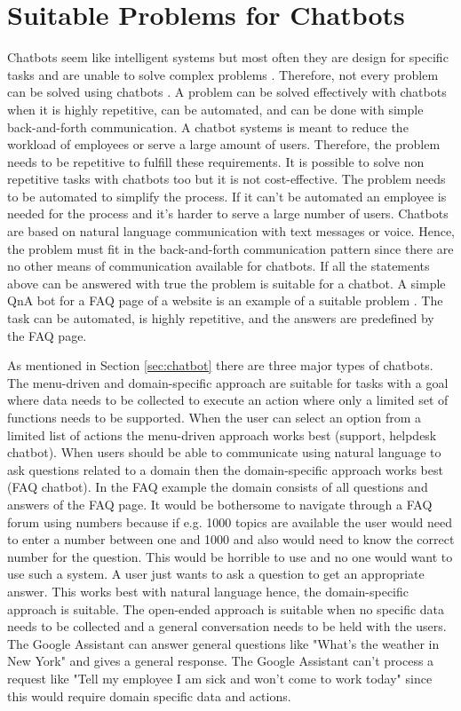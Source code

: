\section{Suitable Problems for Chatbots} 
Chatbots seem like intelligent systems but most often they are design for specific tasks
and are unable to solve complex problems \cite{buiildChatbotsPython}.
Therefore, not every problem can be solved using chatbots \cite{buiildChatbotsPython}.
A problem can be solved effectively with chatbots when it is highly repetitive, can be automated, and 
can be done with simple back-and-forth communication.
A chatbot systems is meant to reduce the workload of employees or serve a large amount of users.
Therefore, the problem needs to be repetitive to fulfill these requirements.
It is possible to solve non repetitive tasks with chatbots too but it is not cost-effective.
The problem needs to be automated to simplify the process.
If it can't be automated an employee is needed for the process and it's harder to 
serve a large number of users.
Chatbots are based on natural language communication with text messages or voice.
Hence, the problem must fit in the back-and-forth communication pattern since there are no 
other means of communication available for chatbots.
If all the statements above can be answered with true the problem is suitable for a chatbot. 
A simple QnA bot for a FAQ page of a website is an example of a suitable problem \cite{buiildChatbotsPython}.
The task can be automated, is highly repetitive, and the answers are predefined by the FAQ page.

As mentioned in Section \ref{sec:chatbot} there are three major types of chatbots.
The menu-driven and domain-specific approach are suitable for tasks with a goal where data needs to
be collected to execute an action where only a limited set of functions needs to be supported. 
When the user can select an option from a limited list of actions the menu-driven approach works best
(support, helpdesk chatbot).
When users should be able to communicate using natural language to ask questions related to a
domain then the domain-specific approach works best (FAQ chatbot). In the FAQ example the domain 
consists of all questions and answers of the FAQ page.
It would be bothersome to navigate through a FAQ forum using numbers because if e.g. 1000 topics
are available the user would need to enter a number between one and 1000 and also would need to 
know the correct number for the question.
This would be horrible to use and no one would want to use such a system.
A user just wants to ask a question to get an appropriate answer.
This works best with natural language hence, the domain-specific approach is suitable.
The open-ended approach is suitable when no specific data needs to be collected and a general 
conversation needs to be held with the users. 
The Google Assistant can answer general questions like "What's the weather in New York" and 
gives a general response.
The Google Assistant can't process a request like 
"Tell my employee I am sick and won't come to work today" since this would require domain specific 
data and actions.




